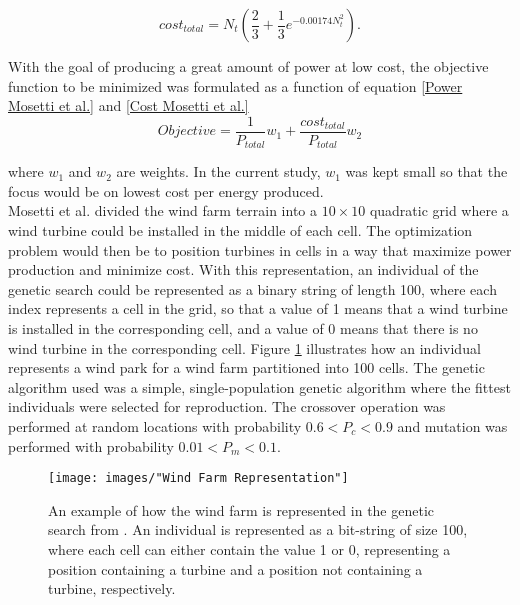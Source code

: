 \begin{equation}
\label{Cost Mosetti et al.}
cost_{total} = N_t \left( \frac{2}{3} + \frac{1}{3}e^{-0.00174N_t^2} \right).
\end{equation}

\noindent With the goal of producing a great amount of power at low cost, the objective function to be minimized was formulated as a function of equation \ref{Power Mosetti et al.} and \ref{Cost Mosetti et al.}\\


\begin{equation}
Objective = \frac{1}{P_{total}}w_1 + \frac{cost_{total}}{P_{total}}w_2
\label{Objective function Mosetti et al.}
\end{equation}


\noindent where $w_1$ and $w_2$ are weights. In the current study, $w_1$ was kept small so that the focus would be on lowest cost per energy produced. \\

\noindent Mosetti et al. divided the wind farm terrain into a $10\times10$ quadratic grid where a wind turbine could be installed in the middle of each cell. The optimization problem would then be to position turbines in cells in a way that maximize power production and minimize cost. With this representation, an individual of the genetic search could be represented as a binary string of length 100, where each index represents a cell in the grid, so that a value of 1 means that a wind turbine is installed in the corresponding cell, and a value of 0 means that there is no wind turbine in the corresponding cell. Figure \ref{Wind Farm Representation} illustrates how an individual represents a wind park for a wind farm partitioned into 100 cells. The genetic algorithm used was a simple, single-population genetic algorithm where the fittest individuals were selected for reproduction. The crossover operation was performed at random locations with probability $0.6 < P_c < 0.9$ and mutation was performed with probability $0.01 < P_m < 0.1$. \\


\begin{figure}[h!]
\begin{center}
\texttt{[image: images/"Wind Farm Representation"]}
\caption{An example of how the wind farm is represented in the genetic search from \cite{Mosetti}. An individual is represented as a bit-string of size 100, where each cell can either contain the value 1 or 0, representing a position containing a turbine and a position not containing a turbine, respectively.}
\label{Wind Farm Representation}
\end{center}
\end{figure}


